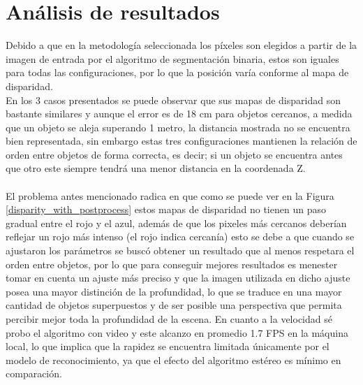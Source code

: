 \section{Análisis de resultados}
Debido a que en la metodología seleccionada los píxeles son elegidos a partir de la imagen de entrada por el algoritmo de segmentación binaria, estos son iguales para todas las configuraciones, por lo que la posición varía conforme al mapa de disparidad. 
\\
En los 3 casos presentados se puede observar que sus mapas de disparidad son bastante similares y aunque el error es de 18 cm para objetos cercanos, a medida que un objeto se aleja superando 1 metro, la distancia mostrada no se encuentra bien representada, sin embargo estas tres configuraciones mantienen la relación de orden entre objetos de forma correcta, es decir; si un objeto se encuentra antes que otro este siempre tendrá una menor distancia en la coordenada Z.
\\
\\
El problema antes mencionado radica en que como se puede ver en la Figura \ref{disparity_with_postprocess} estos mapas de disparidad no tienen un paso gradual entre el rojo y el azul, además de que los pixeles más cercanos deberían reflejar un rojo más intenso (el rojo indica cercanía) esto se debe a que cuando se ajustaron los parámetros se buscó obtener un resultado que al menos respetara el orden entre objetos, por lo que para conseguir mejores resultados es menester tomar en cuenta un ajuste más preciso y que la imagen utilizada en dicho ajuste posea una mayor distinción de la profundidad, lo que se traduce en una mayor cantidad de objetos superpuestos y de ser posible una perspectiva que permita percibir mejor toda la profundidad de la escena. En cuanto a la velocidad sé probo el algoritmo con video y este alcanzo en promedio 1.7 FPS en la máquina local, lo que implica que la rapidez se encuentra limitada únicamente por el modelo de reconocimiento, ya que el efecto del algoritmo estéreo es mínimo en comparación.